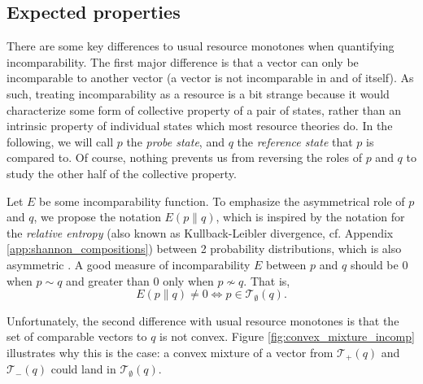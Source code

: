 \subsection{Expected properties}

There are some key differences to usual resource monotones when quantifying incomparability. The first major difference is that a vector can only be incomparable to another vector (a vector is not incomparable in and of itself). As such, treating incomparability as a resource is a bit strange because it would characterize some form of collective property of a pair of states, rather than an intrinsic property of individual states which most resource theories do. In the following, we will call $p$ the \textit{probe state}, and $q$ the \textit{reference state} that $p$ is compared to. Of course, nothing prevents us from reversing the roles of $p$ and $q$ to study the other half of the collective property. 

Let $E$ be some incomparability function. To emphasize the asymmetrical role of $p$ and $q$, we propose the notation $E(p \parallel q)$, which is inspired by the notation for the \textit{relative entropy} (also known as Kullback-Leibler divergence, cf. Appendix \ref{app:shannon_compositions}) between 2 probability distributions, which is also asymmetric \cite[p. 19]{cover_elements_2006}. A good measure of incomparability $E$ between $p$ and $q$ should be 0 when $p \sim q$ and greater than 0 only when $p \nsim q$. That is,
\begin{equation} %
    E(p \parallel q) \neq 0 \iff p \in \mathcal{T}_\emptyset(q). \label{eq:ideal_incomparability}
\end{equation}

Unfortunately, the second difference with usual resource monotones is that the set of comparable vectors to $q$ is not convex. Figure \ref{fig:convex_mixture_incomp} illustrates why this is the case: a convex mixture of a vector from $\mathcal{T}_+(q)$ and $\mathcal{T}_-(q)$ could land in $\mathcal{T}_\emptyset(q)$. %

